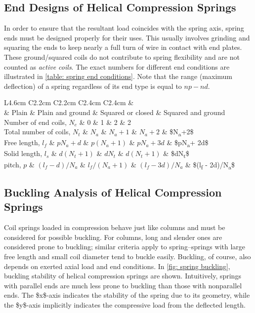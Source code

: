 \documentclass[a4paper,openany,12pt]{book}
\begin{document}
{{\subsection{End Designs of Helical Compression Springs}
\label{end-designs-of-helical-compression-springs}
In order to ensure that the resultant load coincides with the spring
axis, spring ends must be designed properly for their uses. This usually
involves grinding and squaring the ends to keep nearly a full turn of
wire in contact with end plates. These ground/squared coils do not
contribute to spring flexibility and are not counted as \emph{active coils}.
The exact numbers for different end conditions are illustrated in
\ref{table: spring end conditions}. Note
that the range (maximum deflection) of a spring regardless of its end
type is equal to \(np - nd\).


 L4.6cm C2.2cm C2.2cm C2.4cm C2.4cm \&\\
\& Plain \& Plain and ground \& Squared or closed \& Squared and ground\\
Number of end coils, \(N_e\) \& 0 \& 1 \& 2 \& 2\\
Total number of coils, \(N_t\) \& \(N_a\) \& \(N_a+1\) \& \(N_a+2\) \& \$N\textsubscript{a}+2\$\\
Free length, \(l_f\) \& \(pN_a+d\) \& \(p(N_a+1)\) \& \(pN_a+3d\) \& \$pN\textsubscript{a}+ 2d\$\\
Solid length, \(l_s\) \& \(d(N_t+1)\) \& \(d N_t\) \& \(d(N_t+1)\) \& \$dN\textsubscript{t}\$\\
pitch, \(p\) \& \((l_f - d)/N_a\) \& \(l_f/(N_a + 1)\) \& \((l_f - 3d)/N_a\) \&
\$(l\textsubscript{f} - 2d)/N\textsubscript{a}\$\\

\subsection{Buckling Analysis of Helical Compression Springs}
\label{buckling-analysis-of-helical-compression-springs}
Coil springs loaded in compression behave just like columns and must be
considered for possible buckling. For columns, long and slender ones are
considered prone to buckling; similar criteria apply to spring--springs
with large free length and small coil diameter tend to buckle easily.
Buckling, of course, also depends on exerted axial load and end
conditions. In \ref{fig: spring buckling},
buckling stability of helical compression springs are shown.
Intuitively, springs with parallel ends are much less prone to buckling
than those with nonparallel ends. The \$x\$-axis indicates the stability
of the spring due to its geometry, while the \$y\$-axis implicitly
indicates the compressive load from the deflected length.

}}
\end{document}
